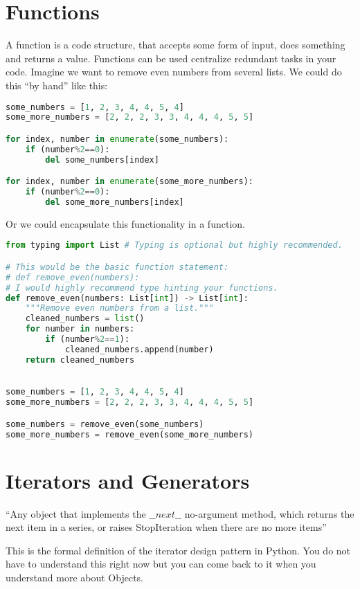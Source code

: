 \documentclass{article}
\newcommand{\qq}[1]{``#1''}
\begin{document}
\section{Functions}

A function is a code structure, that accepts some form of input, does something
and returns a value.
Functions can be used centralize redundant tasks in your code.
Imagine we want to remove even numbers from several lists.
We could do this \qq{by hand} like this:

\begin{lstlisting}[language=python]
some_numbers = [1, 2, 3, 4, 4, 5, 4]
some_more_numbers = [2, 2, 2, 3, 3, 4, 4, 4, 5, 5]

for index, number in enumerate(some_numbers):
    if (number%2==0):
        del some_numbers[index]

for index, number in enumerate(some_more_numbers):
    if (number%2==0):
        del some_more_numbers[index]
\end{lstlisting}

Or we could encapsulate this functionality in a function.

\begin{lstlisting}[language=python]
from typing import List # Typing is optional but highly recommended.

# This would be the basic function statement:
# def remove_even(numbers):
# I would highly recommend type hinting your functions.
def remove_even(numbers: List[int]) -> List[int]:
    """Remove even numbers from a list."""
    cleaned_numbers = list()
    for number in numbers:
        if (number%2==1):
            cleaned_numbers.append(number)
    return cleaned_numbers
    

some_numbers = [1, 2, 3, 4, 4, 5, 4]
some_more_numbers = [2, 2, 2, 3, 3, 4, 4, 4, 5, 5]

some_numbers = remove_even(some_numbers)
some_more_numbers = remove_even(some_more_numbers)
\end{lstlisting}


\section{Iterators and Generators }\label{generators}

\qq{Any object that implements the $\_\_next\_\_$ no-argument method,
    which returns the next item in a series, or raises StopIteration
    when there are no more items}\cite{Ram2015}

This is the formal definition of the iterator design pattern in Python.
You do not have to understand this right now but you can come back to it when
you understand more about Objects.
\end{document}
